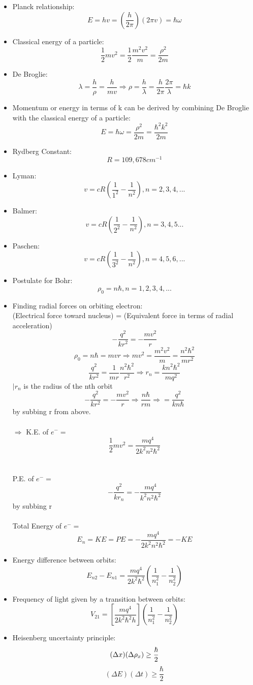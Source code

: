 \documentclass{article}
\begin{document}
\begin{itemize}
\item Planck relationship: $$ E=hv = (\frac{h}{2 \pi})(2 \pi v) = \hbar \omega$$
\item Classical energy of a particle: $$\frac{1}{2}mv^2 = \frac{1}{2}\frac{m^2v^2}{m}=\frac{\rho^2}{2m}$$
\item De Broglie: $$\lambda = \frac{h}{\rho} = \frac{h}{mv}\Rightarrow\rho=\frac{h}{\lambda}=\frac{h}{2\pi}\frac{2\pi}{\lambda}=\hbar k$$
\item Momentum or energy in terms of k can be derived by combining De Broglie with the classical energy of a particle:$$E=\hbar\omega=\frac{\rho^2}{2m}=\frac{\hbar^2 k^2}{2m}$$
\item Rydberg Constant: $$R=109,678cm^{-1}$$
\item Lyman: $$v=cR(\frac{1}{1^2}-\frac{1}{n^2}), n=2,3,4,...$$
\item Balmer: $$v=cR(\frac{1}{2^2}-\frac{1}{n^2}),n=3,4,5...$$
\item Paschen: $$v=cR(\frac{1}{3^2}-\frac{1}{n^2}),n=4,5,6,...$$
\item Postulate for Bohr:$$\rho_0=n\hbar,n=1,2,3,4,...$$
\item Finding radial forces on orbiting electron:\\(Electrical force toward nucleus) = (Equivalent force in terms of radial acceleration)\\$$-\frac{q^2}{kr^2}=-\frac{mv^2}{r}$$
  $$\rho_0=n\hbar=mvr  \Rightarrow mv^2=\frac{m^2v^2}{m}=\frac{n^2\hbar^2}{mr^2}$$ $$\frac{q^2}{kr^2}=\frac{1}{mr}\frac{n^2\hbar^2}{r^2}\Rightarrow r_n=\frac{kn^2\hbar^2}{mq^2}$$ $|r_n$ is the radius of the nth orbit
  $$-\frac{q^2}{kr^2}=-\frac{mv^2}{r}\Rightarrow \frac{n\hbar}{rm}\Rightarrow=\frac{q^2}{kn\hbar}$$by subbing r from above.  \\\\$\Rightarrow$ K.E. of $e^-=$$$\frac{1}{2}mv^2=\frac{mq^4}{2k^2n^2\hbar^2}$$\\\\P.E. of $e^-=$$$-\frac{q^2}{kr_n}=-\frac{mq^4}{k^2n^2\hbar^2}$$ by subbing r\\\\Total Energy of $e^-=$$$E_n=KE=PE=-\frac{mq^4}{2k^2n^2\hbar^2}=-KE$$
\item Energy difference between orbits: $$E_{n2}-E_{n1}=\frac{mq^4}{2k^2\hbar^2}(\frac{1}{n_1^2}-\frac{1}{n_2^2})$$
\item Frequency of light given by a transition between orbits:$$V_{21}=\left[\frac{mq^4}{2k^2\hbar^2h}\right](\frac{1}{n_1^2}-\frac{1}{n_2^2})$$
\item Heisenberg uncertainty principle:\\
  \begin{equation}
    \label{Heisenberg}
    (\Delta x)(\Delta \rho_x) \ge\frac{\hbar}{2}\\
  \end{equation}
  \begin{equation}
    \label{Heisenberg part 2}
    (\Delta E)(\Delta t)\ge\frac{\hbar}{2}
  \end{equation}
\end{itemize}
\end{document}
